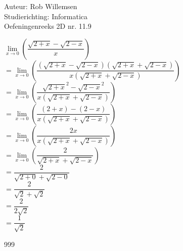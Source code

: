 \documentclass[a4paper]{article}
\begin{document}
\noindent \large Auteur: Rob Willemsen \\
\noindent \large Studierichting: Informatica\\
\noindent \large Oefeningenreeks 2D nr. 11.9\\

\medskip

\normalsize

$\lim\limits_{x \rightarrow 0} \left(\dfrac{\sqrt{2+x}-\sqrt{2-x}}{x}\right)$ \\

$= \lim\limits_{x \rightarrow 0} \left(\dfrac{(\sqrt{2+x}-\sqrt{2-x})(\sqrt{2+x}+\sqrt{2-x})}{x(\sqrt{2+x}+\sqrt{2-x})}\right)$ \\

$= \lim\limits_{x \rightarrow 0} \left(\dfrac{\sqrt{2+x}^2-\sqrt{2-x}^2}{x(\sqrt{2+x}+\sqrt{2-x})}\right)$ \\

$= \lim\limits_{x \rightarrow 0} \left(\dfrac{(2+x)-(2-x)}{x(\sqrt{2+x}+\sqrt{2-x})}\right)$ \\

$= \lim\limits_{x \rightarrow 0} \left(\dfrac{2x}{x(\sqrt{2+x}+\sqrt{2-x})}\right)$ \\

$= \lim\limits_{x \rightarrow 0} \left(\dfrac{2}{\sqrt{2+x}+\sqrt{2-x}}\right)$ \\

$= \dfrac{2}{\sqrt{2+0}+\sqrt{2-0}}$ \\

$= \dfrac{2}{\sqrt{2}+\sqrt{2}}$ \\

$= \dfrac{2}{2\sqrt{2}}$ \\

$= \dfrac{1}{\sqrt{2}}$ \\

\begin{thebibliography}{999}
\end{thebibliography}
\end{document}
